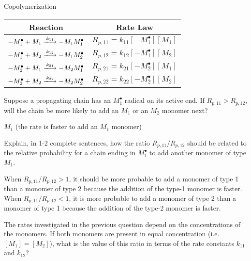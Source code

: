 \begin{activity}{Copolymerization}
\begin{model}
	\begin{center}
		\renewcommand{\arraystretch}{1.8}
		\begin{tabular}{|c|c|}
			\hline
			\textbf{Reaction} & \textbf{Rate Law} \\\hline
			$-M_1^\bullet + M_1 \xlongrightarrow{k_{11}} -M_1M_1^\bullet$ & $R_{p,11} = k_{11}[-M_1^\bullet][M_1]$ \\\hline
			$-M_1^\bullet + M_2 \xlongrightarrow{k_{12}} -M_1M_2^\bullet$ & $R_{p,12} = k_{12}[-M_1^\bullet][M_2]$ \\\hline
			$-M_2^\bullet + M_1 \xlongrightarrow{k_{21}} -M_2M_1^\bullet$ & $R_{p,21} = k_{21}[-M_2^\bullet][M_1]$ \\\hline
			$-M_2^\bullet + M_2 \xlongrightarrow{k_{22}} -M_2M_2^\bullet$ & $R_{p,22} = k_{22}[-M_2^\bullet][M_2]$ \\\hline
		\end{tabular}
	\end{center}

\end{model}

\begin{ctqs}

	\question Suppose a propagating chain has an $M_1^\bullet$ radical on its active end.  If $R_{p,11}>R_{p,12}$, will the chain be more likely to add an $M_1$ or an $M_2$ monomer next?
	
		\begin{solution}[0.5in]
			$M_1$ (the rate is faster to add an $M_1$ monomer)
		\end{solution}
	
	\question Explain, in 1-2 complete sentences, how the ratio $R_{p,11}/R_{p,12}$ should be related to the relative probability for a chain ending in $M_1^\bullet$ to add another monomer of type $M_1$.
	
		\begin{solution}[1in]
			When $R_{p,11}/R_{p,12} > 1$, it should be more probable to add a monomer of type 1 than a monomer of type 2 because the addition of the type-1 monomer is faster.  When $R_{p,11}/R_{p,12}< 1$, it is more probable to add a monomer of type 2 than a monomer of type 1 because the addition of the type-2 monomer is faster.
		\end{solution}
	
	\question The rates investigated in the previous question depend on the concentrations of the monomers.  If both monomers are present in equal concentration (i.e. $[M_1]=[M_2]$), what is the value of this ratio in terms of the rate constants $k_{11}$ and $k_{12}$?
	

\end{ctqs}
\end{activity}
